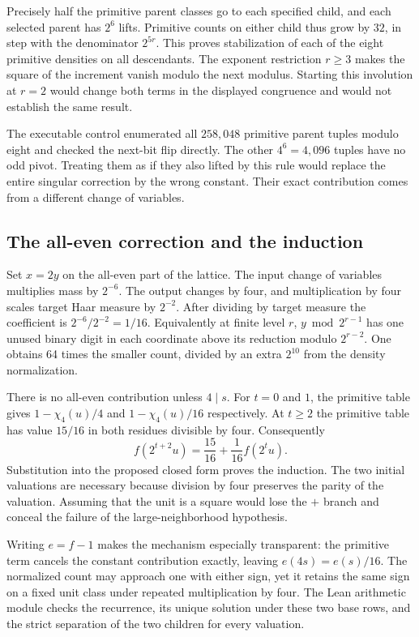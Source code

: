 \documentclass[12pt,letterpaper]{article}
\begin{document}
Precisely half the primitive parent classes go to each specified child, and each selected parent has \(2^6\) lifts. Primitive counts on either child thus grow by \(32\), in step with the denominator \(2^{5r}\). This proves stabilization of each of the eight primitive densities on all descendants. The exponent restriction \(r\ge3\) makes the square of the increment vanish modulo the next modulus. Starting this involution at \(r=2\) would change both terms in the displayed congruence and would not establish the same result.

The executable control enumerated all \(258{,}048\) primitive parent tuples modulo eight and checked the next-bit flip directly. The other \(4^6=4{,}096\) tuples have no odd pivot. Treating them as if they also lifted by this rule would replace the entire singular correction by the wrong constant. Their exact contribution comes from a different change of variables.

\clearpage\subsection{The all-even correction and the induction}
Set \(x=2y\) on the all-even part of the lattice. The input change of variables multiplies mass by \(2^{-6}\). The output changes by four, and multiplication by four scales target Haar measure by \(2^{-2}\). After dividing by target measure the coefficient is \(2^{-6}/2^{-2}=1/16\). Equivalently at finite level \(r\), \(y\bmod2^{r-1}\) has one unused binary digit in each coordinate above its reduction modulo \(2^{r-2}\). One obtains 64 times the smaller count, divided by an extra \(2^{10}\) from the density normalization.

There is no all-even contribution unless \(4\mid s\). For \(t=0\) and \(1\), the primitive table gives \(1-\chi_4(u)/4\) and \(1-\chi_4(u)/16\) respectively. At \(t\ge2\) the primitive table has value \(15/16\) in both residues divisible by four. Consequently
\[
 f(2^{t+2}u)=\frac{15}{16}+\frac1{16}f(2^tu).
\]
Substitution into the proposed closed form proves the induction. The two initial valuations are necessary because division by four preserves the parity of the valuation. Assuming that the unit is a square would lose the \(+\) branch and conceal the failure of the large-neighborhood hypothesis.

Writing \(e=f-1\) makes the mechanism especially transparent: the primitive term cancels the constant contribution exactly, leaving \(e(4s)=e(s)/16\). The normalized count may approach one with either sign, yet it retains the same sign on a fixed unit class under repeated multiplication by four. The Lean arithmetic module checks the recurrence, its unique solution under these two base rows, and the strict separation of the two children for every valuation.
\end{document}

